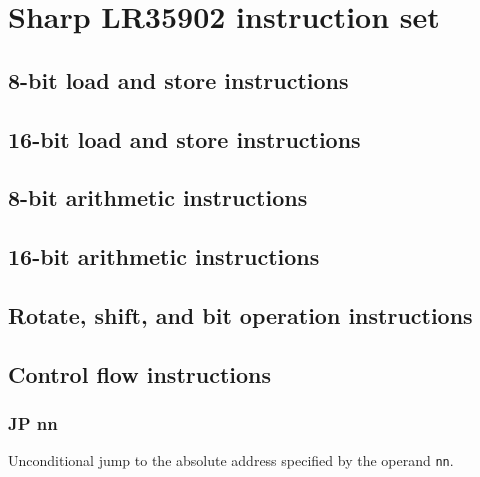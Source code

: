 \chapter{Sharp LR35902 instruction set}

\section{8-bit load and store instructions}

\section{16-bit load and store instructions}

\section{8-bit arithmetic instructions}

\section{16-bit arithmetic instructions}

\section{Rotate, shift, and bit operation instructions}

\section{Control flow instructions}

\subsection{JP nn}
\label{inst:JP}

Unconditional jump to the absolute address specified by the operand \texttt{nn}.

